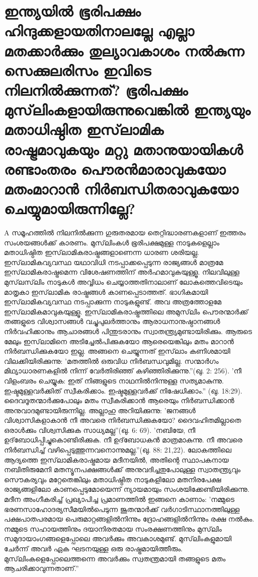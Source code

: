  \section{ ഇന്ത്യയില്‍ ഭൂരിപക്ഷം ഹിന്ദുക്കളായതിനാലല്ലേ എല്ലാ മതക്കാര്‍ക്കും തുല്യാവകാശം നല്‍കുന്ന സെക്കുലരിസം ഇവിടെ നിലനില്‍ക്കുന്നത്? ഭൂരിപക്ഷം മുസ്‌ലിംകളായിരുന്നുവെങ്കില്‍ ഇന്ത്യയും മതാധിഷ്ഠിത ഇസ്‌ലാമിക രാഷ്ട്രമാവുകയും മറ്റു മതാനുയായികള്‍ രണ്ടാംതരം പൌരന്‍മാരാവുകയോ മതംമാറാന്‍ നിര്‍ബന്ധിതരാവുകയോ ചെയ്യുമായിരുന്നില്ലേ?}
  

A സമൂഹത്തില്‍ നിലനില്‍ക്കുന്ന ഗുരുതരമായ തെറ്റിദ്ധാരണകളാണ് ഇത്തരം സംശയങ്ങള്‍ക്ക് കാരണം. മുസ്‌ലിംകള്‍ ഭൂരിപക്ഷമുള്ള നാടുകളെല്ലാം മതാധിഷ്ഠിത ഇസ്‌ലാമികരാഷ്ട്രങ്ങളാണെന്ന ധാരണ ശരിയല്ല. ഇസ്‌ലാമികവ്യവസ്ഥ യഥാവിധി നടപ്പാക്കപ്പെടുന്ന രാജ്യങ്ങള്‍ മാത്രമേ ഇസ്‌ലാമികരാഷ്ട്രമെന്ന വിശേഷണത്തിന് അര്‍ഹമാവുകയുള്ളൂ. നിലവിലുള്ള മുസ്‌ലസ്‌ലിം നാടുകള്‍ അവ്വിധം ചെയ്യാത്തതിനാലാണ് ലോകത്തെവിടെയും മാതൃകാ ഇസ്‌ലാമിക രാഷ്ട്രങ്ങള്‍ കാണപ്പെടാത്തത്. ഭാഗികമായി ഇസ്‌ലാമികവ്യവസ്ഥ നടപ്പാക്കുന്ന നാടുകളുണ്ട്. അവ അത്രത്തോളമേ ഇസ്‌ലാമികമാവുകയുള്ളൂ.
ഇസ്‌ലാമികരാഷ്ട്രത്തിലെ അമുസ്‌ലിം പൌരന്മാര്‍ക്ക് തങ്ങളുടെ വിശ്വാസങ്ങള്‍ വച്ചുപുലര്‍ത്താനും ആരാധനാനുഷ്ഠാനങ്ങള്‍ നിര്‍വഹിക്കാനും ആചാരങ്ങള്‍ പിന്തുടരാനും സ്വാതന്ത്യ്രമുണ്ടായിരിക്കും. ആരുടെ മേലും ഇസ്‌ലാമിനെ അടിച്ചേല്‍പിക്കുകയോ ആരെയെങ്കിലും മതം മാറാന്‍ നിര്‍ബന്ധിക്കുകയോ ഇല്ല. അങ്ങനെ ചെയ്യുന്നത് ഇസ്‌ലാം കണിശമായി വിലക്കിയിരിക്കുന്നു: 'മതത്തില്‍ ഒരുവിധ നിര്‍ബന്ധവുമില്ല. സന്മാര്‍ഗം മിഥ്യാധാരണകളില്‍ നിന്ന് വേര്‍തിരിഞ്ഞ് കഴിഞ്ഞിരിക്കുന്നു.''(ഖു. 2: 256).
'നീ വിളംബരം ചെയ്യുക: ഇത് നിങ്ങളുടെ നാഥനില്‍നിന്നുള്ള സത്യമാകുന്നു. ഇഷ്ടമുള്ളവര്‍ക്കിത് സ്വീകരിക്കാം. ഇഷ്ടമുള്ളവര്‍ക്ക് നിഷേധിക്കാം.'' (ഖു. 18:29).
ദൈവദൂതന്മാര്‍ക്കുപോലും മതം സ്വീകരിക്കാന്‍ ആരെയും നിര്‍ബന്ധിക്കാന്‍ അനുവാദമുണ്ടായിരുന്നില്ല. അല്ലാഹു അറിയിക്കുന്നു: 'ജനങ്ങള്‍ വിശ്വാസികളാകാന്‍ നീ അവരെ നിര്‍ബന്ധിക്കുകയോ? ദൈവഹിതമില്ലാതെ ഒരാള്‍ക്കും വിശ്വസിക്കുക സാധ്യമല്ല''(ഖു. 6: 69).
'നബിയേ, നീ ഉദ്‌ബോധിപ്പിച്ചുകൊണ്ടിരിക്കുക. നീ ഉദ്‌ബോധകന്‍ മാത്രമാകുന്നു. നീ അവരെ നിര്‍ബന്ധിച്ച് വഴിപ്പെടുത്തുന്നവനൊന്നുമല്ല.''(ഖു. 88: 21,22).
ലോകത്തിലെ ആദ്യത്തെ ഇസ്‌ലാമികരാഷ്ട്രമായ മദീനയില്‍, അതിന്റെ സ്ഥാപകനായ നബിതിരുമേനി മതന്യൂനപക്ഷങ്ങള്‍ക്ക് അനുവദിച്ചതുപോലുള്ള സ്വാതന്ത്യ്രവും സൌകര്യവും മറ്റേതെങ്കിലും മതാധിഷ്ഠിത നാടുകളിലോ മതനിരപേക്ഷ രാജ്യങ്ങളിലോ കാണപ്പെടുമോയെന്ന് ന്യായമായും സംശയിക്കേണ്ടിയിരിക്കുന്നു. മദീന അംഗീകരിച്ച് പ്രഖ്യാപിച്ച പ്രമാണത്തില്‍ ഇങ്ങനെ കാണാം: 'നമ്മുടെ ഭരണസാഹോദര്യസീമയില്‍പെടുന്ന ജൂതന്മാര്‍ക്ക് വര്‍ഗാടിസ്ഥാനത്തിലുള്ള പക്ഷപാതപരമായ പെരുമാറ്റങ്ങളില്‍നിന്നും ദ്രോഹങ്ങളില്‍നിന്നും രക്ഷ നല്‍കും. നമ്മുടെ സഹായത്തിനും ദയാനിരതമായ സംരക്ഷണത്തിനും മുസ്‌ലിം സമുദായാംഗങ്ങളെപ്പോലെ അവര്‍ക്കും അവകാശമുണ്ട്. മുസ്‌ലിംകളുമായി ചേര്‍ന്ന് അവര്‍ ഏക ഘടനയുള്ള ഒരു രാഷ്ട്രമായിത്തീരും. മുസ്‌ലിംകളെപ്പോലെത്തന്നെ അവര്‍ക്കും സ്വതന്ത്രമായി തങ്ങളുടെ മതം ആചരിക്കാവുന്നതാണ്.''
